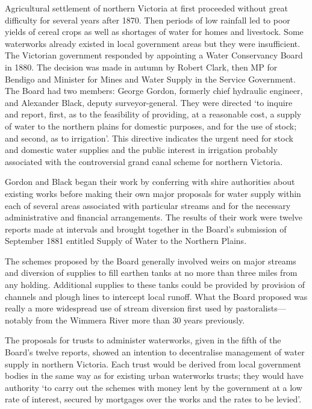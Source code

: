 Agricultural settlement of northern Victoria at first proceeded
without great difficulty for several years after 1870.  Then periods
of low rainfall led to poor yields of cereal crops as well as
shortages of water for homes and livestock.  Some waterworks already
existed in local government areas but they were insufficient.  The
Victorian government responded by appointing a Water Conservancy Board
in 1880.  The decision was made in autumn by Robert Clark, then MP for
Bendigo and Minister for Mines and Water Supply in the Service
Government.  The Board had two members: George Gordon, formerly chief
hydraulic engineer, and Alexander Black, deputy surveyor-general.
They were directed `to inquire and report, first, as to the
feasibility of providing, at a reasonable cost, a supply of water to
the northern plains for domestic purposes, and for the use of stock;
and second, as to irrigation'. This directive indicates the urgent
need for stock and domestic water supplies and the public interest in
irrigation probably associated with the controversial grand canal
scheme for northern Victoria.

Gordon and Black began their work by conferring with shire authorities
about existing works before making their own major proposals for water
supply within each of several areas associated with particular streams
and for the necessary administrative and financial arrangements.  The
results of their work were twelve reports made at intervals and
brought together in the Board's submission of September 1881 entitled
Supply of Water to the Northern Plains.\fn{VicPP no.\,18 of 1881, LA
vol.\,II.}

The schemes proposed by the Board generally involved weirs on major
streams and diversion of supplies to fill earthen tanks at no more
than three miles from any holding. Additional supplies to these tanks
could be provided by provision of channels and plough lines to
intercept local runoff.  What the Board proposed was really a more
widespread use of stream diversion first used by
pastoralists---notably from the Wimmera River more than 30 years
previously.

The proposals for trusts to administer waterworks, given in the fifth
of the Board's twelve reports, showed an intention to decentralise
management of water supply in northern Victoria.  Each trust would be
derived from local government bodies in the same way as for existing
urban waterworks trusts; they would have authority `to carry out the
schemes with money lent by the government at a low rate of interest,
secured by mortgages over the works and the rates to be
levied'.

